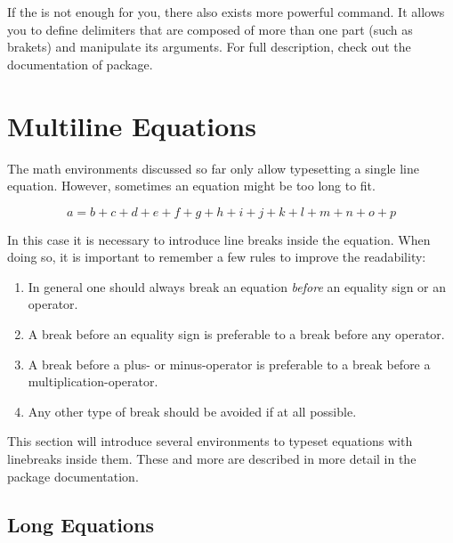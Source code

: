 If the  is not enough for you, there also exists
more powerful  command. It allows you to define
delimiters that are composed of more than one part (such as brakets) and
manipulate its arguments. For full description, check out the documentation
of  package.

\section{Multiline Equations}

The math environments discussed so far only allow typesetting a single line
equation. However, sometimes an equation might be too long to fit.
\begin{example}
\begin{equation}
  a = b + c + d + e + f 
  + g + h + i + j 
  + k + l + m + n + o + p  
\end{equation}
\end{example}
In this case it is necessary to introduce line breaks inside the equation. When
doing so, it is important to remember a few rules to improve the readability:
\begin{enumerate}
  \item In general one should always break an equation \emph{before} an
        equality sign or an operator.
  \item A break before an equality sign is preferable to a break before
        any operator.
  \item A break before a plus- or minus-operator is preferable to a break
        before a multiplication-operator.
  \item Any other type of break should be avoided if at all possible.
\end{enumerate}

This section will introduce several environments to typeset equations with
linebreaks inside them. These and more are described in more detail in the
 package documentation.

\subsection{Long Equations}\label{sec:multline}

